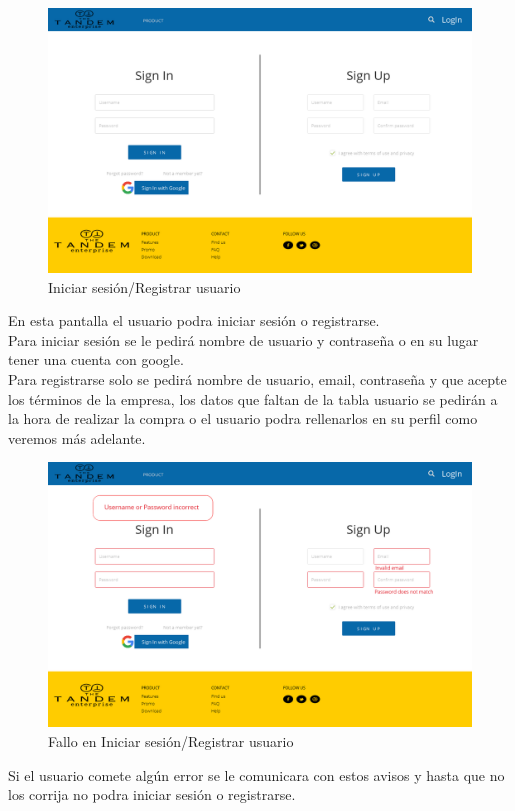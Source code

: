 \documentclass{article}
\begin{document}
\begin{figure}[h]
    \centering
    \includegraphics[scale=0.25]{mockup/Login.png}
    \caption{Iniciar sesión/Registrar usuario}
    \label{Fig:Login}
\end{figure}
\quad En esta pantalla el usuario podra iniciar sesión o registrarse.\\
Para iniciar sesión se le pedirá nombre de usuario y contraseña o en su lugar tener una cuenta con google.\\
Para registrarse solo se pedirá nombre de usuario, email, contraseña y que acepte los términos de la empresa, los datos que faltan de la tabla usuario se pedirán a la hora de realizar la compra o el usuario podra rellenarlos en su perfil como veremos más adelante.

\begin{figure}[h]
    \centering
    \includegraphics[scale=0.25]{mockup/Fail_login.png}
    \caption{Fallo en Iniciar sesión/Registrar usuario}
    \label{Fig:Fail_login}
\end{figure}
\quad Si el usuario comete algún error se le comunicara con estos avisos y hasta que no los corrija no podra iniciar sesión o registrarse.
\end{document}
